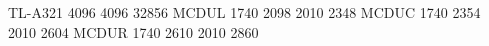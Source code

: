 TL-A321 4096 4096 32856
MCDUL        1740    2098  2010   2348
MCDUC        1740    2354  2010   2604
MCDUR        1740    2610  2010   2860